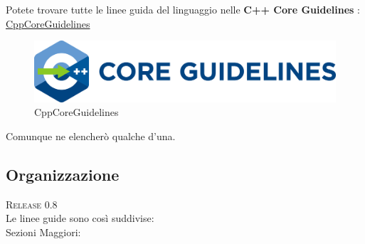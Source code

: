\newpage

\textsf{\small Potete trovare tutte le linee guida del linguaggio nelle \textbf{C++ Core Guidelines} : \href{https://github.com/isocpp/CppCoreGuidelines}{CppCoreGuidelines}} \\


\begin{figure}[H]
	\centering
	\includegraphics[width=1\textwidth, height=1\textheight, keepaspectratio]{./imgs/CppCoreGuidelines.png}
	\caption{CppCoreGuidelines}
	\label{fig:CppCoreGuidelines}
\end{figure}

\textsf{\small Comunque ne elencherò qualche d'una. } \\



\subsection{Organizzazione} %

\textsc{\footnotesize Release 0.8} \\

\textsf{Le linee guide sono così suddivise: } \\

\textsf{Sezioni Maggiori: } \\ %

